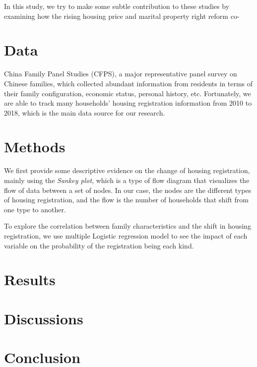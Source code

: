 \documentclass[11pt]{article}
\begin{document}
In this study, we try to make some subtle contribution to these studies by examining how the rising housing price and marital property right reform co-


\section{Data} \label{sec:data}

China Family Panel Studies (CFPS), a major representative panel survey on Chinese families, which collected abundant information from residents in terms of their family configuration, economic status, personal history, etc. Fortunately, we are able to track many households' housing registration information from 2010 to 2018, which is the main data source for our research. 

\section{Methods} \label{sec:method}

We first provide some descriptive evidence on the change of housing registration, mainly using the \textit{Sankey plot}, which is a type of flow diagram that visualizes the flow of data between a set of nodes. In our case, the nodes are the different types of housing registration, and the flow is the number of households that shift from one type to another.

To explore the correlation between family characteristics and the shift in housing registration, we use multiple Logistic regression model to see the impact of each variable on the probability of the registration being each kind.

\section{Results} \label{sec:result}

\section{Discussions} \label{sec:discussion}

\section{Conclusion} \label{sec:conclusion}



\singlespacing
\setlength\bibsep{0pt}


\end{document}
